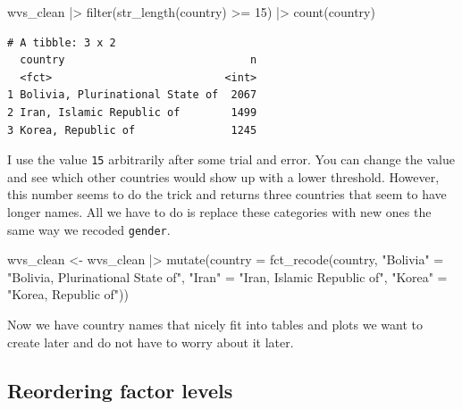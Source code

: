 \documentclass[
  letterpaper,
]{krantz}
\makeatletter
\newenvironment{Shaded}{\begin{snugshade}}{\end{snugshade}}
\newcommand{\AttributeTok}[1]{\textcolor[rgb]{0.40,0.45,0.13}{#1}}
\newcommand{\DecValTok}[1]{\textcolor[rgb]{0.68,0.00,0.00}{#1}}
\newcommand{\FunctionTok}[1]{\textcolor[rgb]{0.28,0.35,0.67}{#1}}
\newcommand{\NormalTok}[1]{\textcolor[rgb]{0.00,0.23,0.31}{#1}}
\newcommand{\OtherTok}[1]{\textcolor[rgb]{0.00,0.23,0.31}{#1}}
\newcommand{\SpecialCharTok}[1]{\textcolor[rgb]{0.37,0.37,0.37}{#1}}
\newcommand{\StringTok}[1]{\textcolor[rgb]{0.13,0.47,0.30}{#1}}
\newenvironment{kframe}{%
\medskip{}
\setlength{\fboxsep}{.8em}
 \def\at@end@of@kframe{}%
 \ifinner\ifhmode%
  \def\at@end@of@kframe{\end{minipage}}%
  \begin{minipage}{\columnwidth}%
 \fi\fi%
 \def\FrameCommand##1{\hskip\@totalleftmargin \hskip-\fboxsep
 \colorbox{shadecolor}{##1}\hskip-\fboxsep
     \hskip-\linewidth \hskip-\@totalleftmargin \hskip\columnwidth}%
 \MakeFramed {\advance\hsize-\width
   \@totalleftmargin\z@ \linewidth\hsize
   \@setminipage}}%
 {\par\unskip\endMakeFramed%
 \at@end@of@kframe}
\renewenvironment{Shaded}{\begin{kframe}}{\end{kframe}}
\makeatother
\begin{document}
\begin{Shaded}
\begin{Highlighting}[]
\NormalTok{wvs\_clean }\SpecialCharTok{|\textgreater{}}
  \FunctionTok{filter}\NormalTok{(}\FunctionTok{str\_length}\NormalTok{(country) }\SpecialCharTok{\textgreater{}=} \DecValTok{15}\NormalTok{) }\SpecialCharTok{|\textgreater{}}
  \FunctionTok{count}\NormalTok{(country)}
\end{Highlighting}
\end{Shaded}

\begin{verbatim}
# A tibble: 3 x 2
  country                             n
  <fct>                           <int>
1 Bolivia, Plurinational State of  2067
2 Iran, Islamic Republic of        1499
3 Korea, Republic of               1245
\end{verbatim}

I use the value \texttt{15} arbitrarily after some trial and error. You
can change the value and see which other countries would show up with a
lower threshold. However, this number seems to do the trick and returns
three countries that seem to have longer names. All we have to do is
replace these categories with new ones the same way we recoded
\texttt{gender}.

\begin{Shaded}
\begin{Highlighting}[]
\NormalTok{wvs\_clean }\OtherTok{\textless{}{-}}
\NormalTok{  wvs\_clean }\SpecialCharTok{|\textgreater{}}
  \FunctionTok{mutate}\NormalTok{(}\AttributeTok{country =} \FunctionTok{fct\_recode}\NormalTok{(country,}
                              \StringTok{"Bolivia"} \OtherTok{=} \StringTok{"Bolivia, Plurinational State of"}\NormalTok{,}
                              \StringTok{"Iran"} \OtherTok{=} \StringTok{"Iran, Islamic Republic of"}\NormalTok{,}
                              \StringTok{"Korea"} \OtherTok{=} \StringTok{"Korea, Republic of"}\NormalTok{))}
\end{Highlighting}
\end{Shaded}

Now we have country names that nicely fit into tables and plots we want
to create later and do not have to worry about it later.

\subsection{Reordering factor
levels}\label{sec-reordering-factor-levels}
\end{document}

